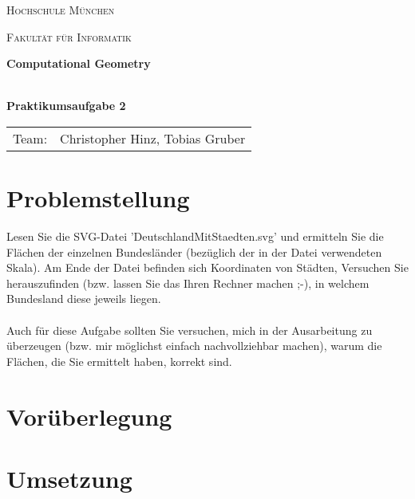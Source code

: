 \documentclass[12pt]{scrartcl}
\begin{document}
\begin{titlepage}
    \vfill
	\centering
	{\scshape\LARGE Hochschule München \par}
    {\scshape\Large Fakultät für Informatik \par}
	\vspace{1.5cm}




    \vfill
	{\LARGE\bfseries Computational Geometry\\~\\ \par}
	{\LARGE\bfseries Praktikumsaufgabe 2\par}
	\vfill
    \vfill


    \begin{tabular}{ll}
    \normalsize
    Team:  & Christopher Hinz, Tobias Gruber\\
    \end{tabular}

	\vfill

\end{titlepage}

\newpage



\raggedright

\section{Problemstellung}
Lesen Sie die SVG-Datei 'DeutschlandMitStaedten.svg' und ermitteln Sie die Flächen der einzelnen Bundesländer (bezüglich der in der Datei verwendeten Skala). 
Am Ende der Datei befinden sich Koordinaten von Städten, Versuchen Sie herauszufinden (bzw. lassen Sie das Ihren Rechner machen ;-), in welchem Bundesland diese jeweils liegen.\\~\\
Auch für diese Aufgabe sollten Sie versuchen, mich in der Ausarbeitung zu überzeugen (bzw. mir möglichst einfach nachvollziehbar machen), warum die Flächen, die Sie ermittelt haben, korrekt sind.


\section{Vorüberlegung}


\section{Umsetzung}
\end{document}
